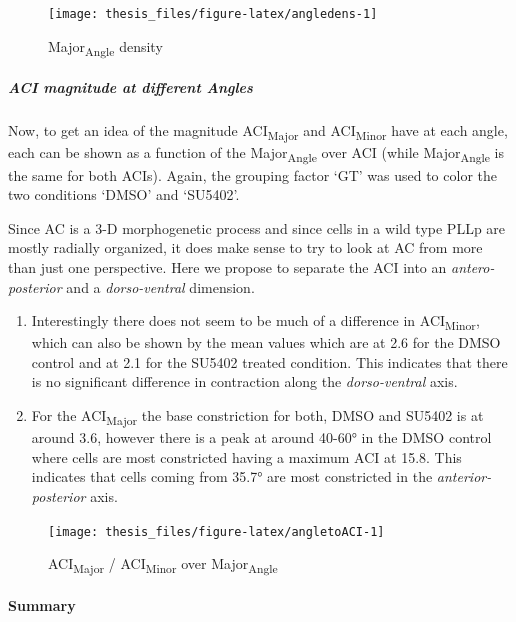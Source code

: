 \documentclass[11pt,singlespacinge,twoside]{reedthesis} %
\begin{document}
\begin{figure}

{\centering \texttt{[image: thesis\_files/figure-latex/angledens-1]} 

}

\caption{Major\textsubscript{Angle} density}\label{fig:angledens}
\end{figure}
\hypertarget{ACI-mag}{%
\subparagraph{ACI magnitude at different Angles}\label{ACI-mag}}

Now, to get an idea of the magnitude ACI\textsubscript{Major} and ACI\textsubscript{Minor} have at each angle, each can be shown as a function of the Major\textsubscript{Angle} over ACI (while Major\textsubscript{Angle} is the same for both ACIs). Again, the grouping factor `GT' was used to color the two conditions `DMSO' and `SU5402'.

\noindent Since AC is a 3-D morphogenetic process and since cells in a wild type PLLp are mostly radially organized, it does make sense to try to look at AC from more than just one perspective. Here we propose to separate the ACI into an \emph{antero-posterior} and a \emph{dorso-ventral} dimension.
\begin{enumerate}
\def\labelenumi{\arabic{enumi}.}
\item
  Interestingly there does not seem to be much of a difference in ACI\textsubscript{Minor}, which can also be shown by the mean values which are at 2.6 for the DMSO control and at 2.1 for the SU5402 treated condition. This indicates that there is no significant difference in contraction along the \emph{dorso-ventral} axis.
\item
  For the ACI\textsubscript{Major} the base constriction for both, DMSO and SU5402 is at around 3.6, however there is a peak at around 40-60° in the DMSO control where cells are most constricted having a maximum ACI at 15.8. This indicates that cells coming from 35.7° are most constricted in the \emph{anterior-posterior} axis.
\end{enumerate}

\begin{figure}

{\centering \texttt{[image: thesis\_files/figure-latex/angletoACI-1]} 

}

\caption{ACI\textsubscript{Major} / ACI\textsubscript{Minor} over Major\textsubscript{Angle}}\label{fig:angletoACI}
\end{figure}
\hypertarget{summary-3}{%
\paragraph{Summary}\label{summary-3}}
\end{document}
